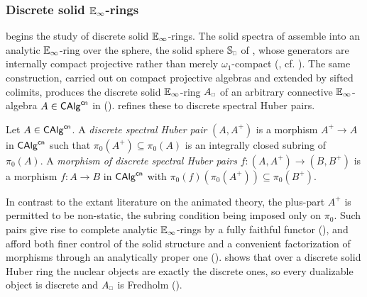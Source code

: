 \subsubsection{Discrete solid \texorpdfstring{$\mathbb{E}_{\infty}$}{E-infinity}-rings}\label{subsubsec: intro solid}
 begins the study of discrete solid $\mathbb{E}_{\infty}$-rings. The solid spectra of  assemble into an analytic $\mathbb{E}_{\infty}$-ring over the sphere, the solid sphere $\Sph_{\sld}$ of , whose generators are internally compact projective rather than merely $\omega_{1}$-compact (, cf. ). The same construction, carried out on compact projective algebras and extended by sifted colimits, produces the discrete solid $\mathbb{E}_{\infty}$-ring $A_{\sld}$ of an arbitrary connective $\mathbb{E}_{\infty}$-algebra $A\in\mathsf{CAlg}^{\mathsf{cn}}$ in  ().  refines these to discrete spectral Huber pairs.
\begin{definition*}[\ref{def: discrete spectral Huber pair}]
    Let $A\in\mathsf{CAlg}^{\mathsf{cn}}$. A \emph{discrete spectral Huber pair} $(A,A^{+})$ is a morphism $A^{+}\to A$ in $\mathsf{CAlg}^{\mathsf{cn}}$ such that $\pi_{0}(A^{+})\subseteq\pi_{0}(A)$ is an integrally closed subring of $\pi_{0}(A)$. A \emph{morphism of discrete spectral Huber pairs} $f:(A,A^{+})\to(B,B^{+})$ is a morphism $f: A\to B$ in $\mathsf{CAlg}^{\mathsf{cn}}$ with $\pi_{0}(f)(\pi_{0}(A^{+}))\subseteq\pi_{0}(B^{+})$.
\end{definition*}
In contrast to the extant literature on the animated theory, the plus-part $A^{+}$ is permitted to be non-static, the subring condition being imposed only on $\pi_{0}$. Such pairs give rise to complete analytic $\mathbb{E}_{\infty}$-rings by a fully faithful functor (), and afford both finer control of the solid structure and a convenient factorization of morphisms through an analytically proper one ().  shows that over a discrete solid Huber ring the nuclear objects are exactly the discrete ones, so every dualizable object is discrete and $A_{\sld}$ is Fredholm ().

